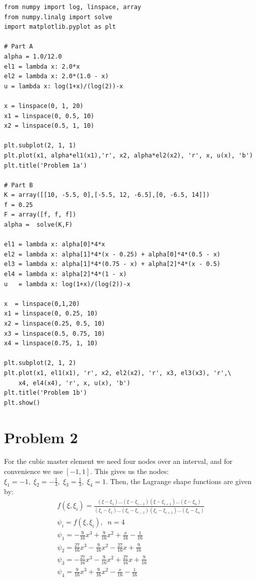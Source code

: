 \documentclass[10pt]{article}
\begin{document}

\begin{lstlisting}
from numpy import log, linspace, array
from numpy.linalg import solve
import matplotlib.pyplot as plt

# Part A
alpha = 1.0/12.0
el1 = lambda x: 2.0*x
el2 = lambda x: 2.0*(1.0 - x)
u = lambda x: log(1+x)/(log(2))-x

x = linspace(0, 1, 20)
x1 = linspace(0, 0.5, 10)
x2 = linspace(0.5, 1, 10)

plt.subplot(2, 1, 1)
plt.plot(x1, alpha*el1(x1),'r', x2, alpha*el2(x2), 'r', x, u(x), 'b')
plt.title('Problem 1a')

# Part B
K = array([[10, -5.5, 0],[-5.5, 12, -6.5],[0, -6.5, 14]])
f = 0.25
F = array([f, f, f])
alpha =  solve(K,F)

el1 = lambda x: alpha[0]*4*x
el2 = lambda x: alpha[1]*4*(x - 0.25) + alpha[0]*4*(0.5 - x)
el3 = lambda x: alpha[1]*4*(0.75 - x) + alpha[2]*4*(x - 0.5)
el4 = lambda x: alpha[2]*4*(1 - x)
u   = lambda x: log(1+x)/(log(2))-x

x  = linspace(0,1,20)
x1 = linspace(0, 0.25, 10)
x2 = linspace(0.25, 0.5, 10)
x3 = linspace(0.5, 0.75, 10)
x4 = linspace(0.75, 1, 10)

plt.subplot(2, 1, 2)
plt.plot(x1, el1(x1), 'r', x2, el2(x2), 'r', x3, el3(x3), 'r',\
	x4, el4(x4), 'r', x, u(x), 'b')
plt.title('Problem 1b')
plt.show()
\end{lstlisting}

\section*{Problem 2}
For the cubic master element we need four nodes over an interval, and for convenience we use $[-1, 1]$. This gives us the nodes: $\xi_1 = -1,\; \xi_2= -\frac13,\;\xi_3=\frac13,\;\xi_4=1.$
Then, the Lagrange shape functions are given by:
\begin{gather*}
f(\xi, \xi_i) = \frac{(\xi - \xi_1)...(\xi-\xi_{i-1})(\xi - \xi_{i+1})...(\xi - \xi_n)}{(\xi_i - \xi_1)...(\xi_i-\xi_{i-1})(\xi_i - \xi_{i+1})...(\xi_i - \xi_n)}\\
\psi_i = f(\xi, \xi_i), \;\; n = 4 \\
\psi_1 = -\frac{9}{16}x^3+\frac{9}{16}x^2 + \frac x{16} - \frac1{16}\\
\psi_2 = \frac{27}{16}x^3 - \frac{9}{16}x^2-\frac{27}{16}x+\frac9{16}\\
\psi_3 = -\frac{27}{16}x^3-\frac9{16}x^2+\frac{27}{16}x+\frac9{16}\\
\psi_4 = \frac9{16}x^3+\frac9{16}x^2-\frac x{16}-\frac1{16}
\end{gather*}
\end{document}
